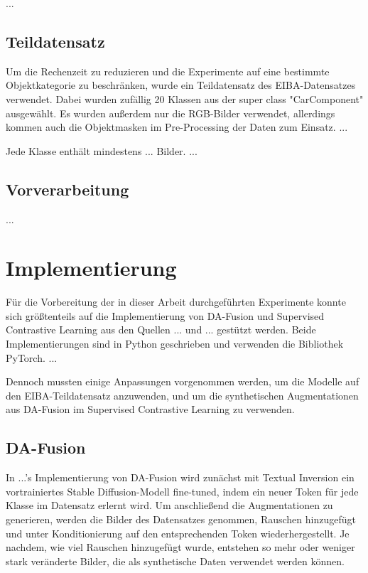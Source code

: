 ...

\subsection{Teildatensatz}

Um die Rechenzeit zu reduzieren und die Experimente auf eine bestimmte Objektkategorie zu beschränken, wurde ein Teildatensatz des EIBA-Datensatzes verwendet. Dabei wurden zufällig 20 Klassen aus der super class "CarComponent" ausgewählt. Es wurden außerdem nur die RGB-Bilder verwendet, allerdings kommen auch die Objektmasken im Pre-Processing der Daten zum Einsatz. ...

Jede Klasse enthält mindestens ... Bilder. ...

\subsection{Vorverarbeitung}

...

\section{Implementierung}

Für die Vorbereitung der in dieser Arbeit durchgeführten Experimente konnte sich größtenteils auf die Implementierung von DA-Fusion und Supervised Contrastive Learning aus den Quellen ... und ... gestützt werden. Beide Implementierungen sind in Python geschrieben und verwenden die Bibliothek PyTorch. ...

Dennoch mussten einige Anpassungen vorgenommen werden, um die Modelle auf den EIBA-Teildatensatz anzuwenden, und um die synthetischen Augmentationen aus DA-Fusion im Supervised Contrastive Learning zu verwenden.

\subsection{DA-Fusion}

In ...'s Implementierung von DA-Fusion wird zunächst mit Textual Inversion ein vortrainiertes Stable Diffusion-Modell fine-tuned, indem ein neuer Token für jede Klasse im Datensatz erlernt wird. Um anschließend die Augmentationen zu generieren, werden die Bilder des Datensatzes genommen, Rauschen hinzugefügt und unter Konditionierung auf den entsprechenden Token wiederhergestellt. Je nachdem, wie viel Rauschen hinzugefügt wurde, entstehen so mehr oder weniger stark veränderte Bilder, die als synthetische Daten verwendet werden können.

